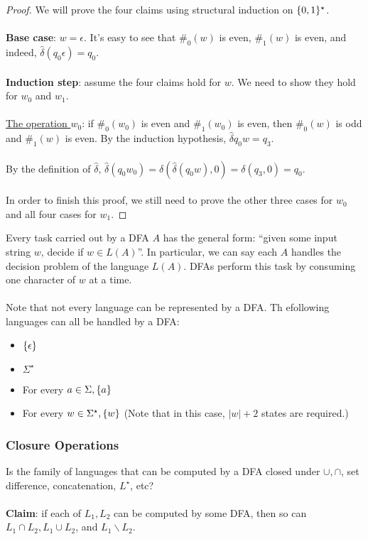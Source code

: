 \documentclass[]{article}
\DeclarePairedDelimiter{\set}{\lbrace}{\rbrace}
\theoremstyle{definition}
\begin{document}
      \begin{proof}
        We will prove the four claims using structural induction on $\set{0, 1}^\star$.
        \\ \\
        \textbf{Base case}: $w = \epsilon$. It's easy to see that $\#_0(w)$ is even, $\#_1(w)$ is even, and indeed, $\hat{\delta}(q_0 \epsilon) = q_0$.
        \\ \\
        \textbf{Induction step}: assume the four claims hold for $w$. We need to show they hold for $w_0$ and $w_1$.
        \\ \\
        \underline{The operation $w_0$}: if $\#_0(w_0)$ is even and $\#_1(w_0)$ is even, then $\#_0(w)$ is odd and $\#_1(w)$ is even. By the induction hypothesis, $\hat{\delta}{q_0 w} = q_3$.
        \\ \\
        By the definition of $\hat{\delta}$, $\hat{\delta}(q_0 w_0) = \delta( \hat{\delta}(q_0 w), 0) = \delta(q_3, 0) = q_0$.
        \\ \\
        In order to finish this proof, we still need to prove the other three cases for $w_0$ and all four cases for $w_1$.
      \end{proof}

      Every task carried out by a DFA $A$ has the general form: ``given some input string $w$, decide if $w \in L(A)$''. In particular, we can say each $A$ handles the decision problem of the language $L(A)$. DFAs perform this task by consuming one character of $w$ at a time.
      \\ \\
      Note that not every language can be represented by a DFA. Th efollowing languages can all be handled by a DFA:
      \begin{itemize}
        \item $\set{ \epsilon }$
        \item $\Sigma^\star$
        \item For every $a \in \Sigma, \set{a}$
        \item For every $w \in \Sigma^\star, \set{w}$ (Note that in this case, $|w| + 2$ states are required.)
      \end{itemize}

      \subsubsection{Closure Operations}
        Is the family of languages that can be computed by a DFA closed under $\cup, \cap$, set difference, concatenation, $L^\star$, etc?
        \\ \\
        \textbf{Claim}: if each of $L_1, L_2$ can be computed by some DFA, then so can $L_1 \cap L_2, L_1 \cup L_2$, and $L_1 \backslash L_2$.
\end{document}
